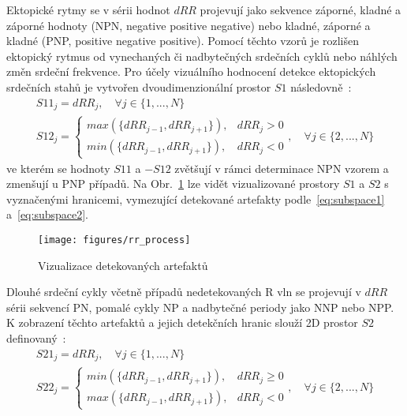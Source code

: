 Ektopické rytmy se v sérii hodnot $dRR$ projevují jako sekvence záporné, kladné
a záporné hodnoty (NPN, negative positive negative) nebo kladné, záporné a
kladné (PNP, positive negative positive). Pomocí těchto vzorů je rozlišen
ektopický rytmus od vynechaných či nadbytečných srdečních cyklů nebo náhlých
změn srdeční frekvence. Pro účely vizuálního hodnocení detekce ektopických
srdečních stahů je vytvořen dvoudimenzionální prostor $S1$
následovně~\cite{Lipponen2019}:
\begin{gather}
    S11_j = dRR_j, \quad \forall j \in \{1,...,N\} \nonumber \\
    S12_j =
    \begin{cases}
        max(\{dRR_{j-1}, dRR_{j+1}\}), & dRR_j > 0 \\
        min(\{dRR_{j-1}, dRR_{j+1}\}), & dRR_j < 0
    \end{cases}
    , \quad \forall j \in \{2,...,N\}
    \label{eq:subspace1}
\end{gather}
ve kterém se hodnoty $S11$ a $-S12$ zvětšují v rámci determinace NPN vzorem a
zmenšují u PNP případů. Na Obr.~\ref{fig:rr_process} lze vidět vizualizované
prostory $S1$ a $S2$ s vyznačenými hranicemi, vymezující detekované artefakty
podle~\eqref{eq:subspace1} a~\eqref{eq:subspace2}.

\begin{figure}[h]
    \begin{center}
        \texttt{[image: figures/rr\_process]}
        \caption{Vizualizace detekovaných artefaktů}
        \label{fig:rr_process}
    \end{center}
\end{figure}

Dlouhé srdeční cykly včetně případů nedetekovaných R vln se projevují v $dRR$
sérii sekvencí PN, pomalé cykly NP a nadbytečné periody jako NNP nebo NPP. K
zobrazení těchto artefaktů a jejich detekčních hranic slouží 2D prostor $S2$
definovaný~\cite{Lipponen2019}:
\begin{gather}
    S21_j = dRR_j, \quad \forall j \in \{1,...,N\} \nonumber \\
    S22_j =
    \begin{cases}
        min(\{dRR_{j-1}, dRR_{j+1}\}), & dRR_j \geq 0 \\
        max(\{dRR_{j-1}, dRR_{j+1}\}), & dRR_j < 0
    \end{cases}
    , \quad \forall j \in \{2,...,N\}
    \label{eq:subspace2}
\end{gather}


